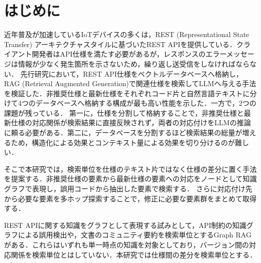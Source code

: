 \section{はじめに}

近年普及が加速しているIoTデバイスの多くは\cite{makhshari2021iot}，REST (Representational State Transfer) アーキテクチャスタイル\cite{fielding2000architectural}に基づいたREST APIを提供している．クライアント開発者はAPI仕様を満たす必要があるが，レスポンスのエラーメッセージは情報が少なく発生箇所を示さないため，繰り返し送受信をしなければならない．
先行研究\cite{inoue2025dbrag}において，REST API仕様をベクトルデータベースへ格納し，RAG (Retrieval Augmented Generation)\cite{lewis2020retrieval}で関連仕様を検索してLLMへ与える手法を検証した．非推奨仕様と最新仕様をそれぞれコード片と自然言語テキストに分けて4つのデータベースへ格納する構成が最も高い性能を示した．一方で，2つの課題が残っている．
第一に，仕様を分割して格納することで，非推奨仕様と最新仕様の対応関係が検索結果に直接反映されず，両者の対応付けをLLMの推論に頼る必要がある．第二に，データベースを分割するほど検索結果の総量が増えるため，構造化による効果とコンテキスト量による効果を切り分けるのが難しい．

そこで本研究では，検索単位を仕様のテキスト片ではなく仕様の差分に置く手法を提案する．非推奨仕様の要素から最新仕様の要素への対応をノードとして知識グラフで表現し，誤用コードから抽出した要素で検索する．
さらに対応付け先から必要な要素を多ホップ探索することで，修正に必要な要素群をまとめて取得する．


REST APIに関する知識をグラフとして表現する試みとして，API制約の知識グラフによる誤用検出\cite{ren2020api}や，文書のコミュニティ要約を検索単位とするGraph RAG\cite{edge2024graphrag}がある．これらはいずれも単一時点の知識を対象としており，バージョン間の対応関係を検索単位とはしていない．本研究では仕様間の差分を検索単位とする．


